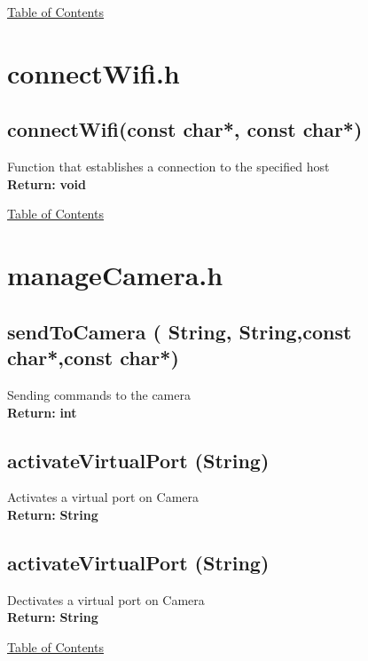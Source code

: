 \documentclass[11pt, numbers=endperiod]{report}
\newcommand{\Vseparation}{\vspace{10mm}}
\newcommand{\setColor}[1]
			{\color{blue!}\textbf{#1}\color{black!}}
\newcommand\MySection[2][\DefaultOpt]{%
  \def\DefaultOpt{#2}%
  \color{cyan!}\section[#1]{#2}\color{black!}%
}
\begin{document}
\hyperlink{toc}{Table of Contents}

\newpage

\MySection{connectWifi.h}
\label{sec: connectWifi.h}
\begin{tcolorbox}[colback=white,colframe=cyan,width=\dimexpr\textwidth+12mm\relax,enlarge left by=-6mm]


\subsection*{connectWifi(const char*, const char*)}
Function that establishes a connection to the specified host\\

\textbf{Return:} \setColor{void}
\hspace{20mm}


\end{tcolorbox}

\hyperlink{toc}{Table of Contents}


\MySection{manageCamera.h}
\label{sec: manageCamera.h}
\begin{tcolorbox}[colback=white,colframe=cyan,width=\dimexpr\textwidth+12mm\relax,enlarge left by=-6mm]


\subsection*{sendToCamera ( String, String,const char*,const char*)}
Sending commands to the camera\\

\textbf{Return:} \setColor{int}
\Vseparation

\subsection*{activateVirtualPort (String)}
Activates a virtual port on Camera\\

\textbf{Return:} \setColor{String}
\Vseparation

\subsection*{activateVirtualPort (String)}
Dectivates a virtual port on Camera\\

\textbf{Return:} \setColor{String}
\Vseparation
\end{tcolorbox}
\hyperlink{toc}{Table of Contents}
\end{document}
